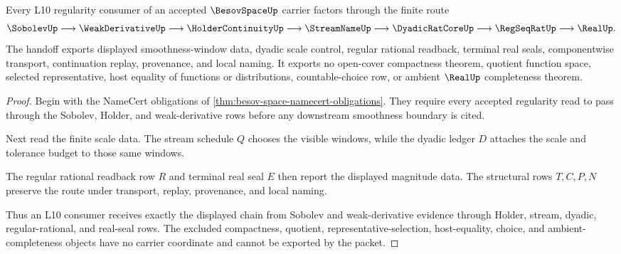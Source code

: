 \begin{theorem}
\label{thm:besov-space-l10-handoff}
Every L10 regularity consumer of an accepted $\BesovSpaceUp$ carrier factors through the finite route
$$
\SobolevUp \longrightarrow \WeakDerivativeUp \longrightarrow \HolderContinuityUp \longrightarrow \StreamNameUp \longrightarrow \DyadicRatCoreUp \longrightarrow \RegSeqRatUp \longrightarrow \RealUp .
$$
The handoff exports displayed smoothness-window data, dyadic scale control, regular rational readback, terminal real seals, componentwise transport, continuation replay, provenance, and local naming. It exports no open-cover compactness theorem, quotient function space, selected representative, host equality of functions or distributions, countable-choice row, or ambient $\RealUp$ completeness theorem.
\end{theorem}
\begin{proof}
Begin with the NameCert obligations of \autoref{thm:besov-space-namecert-obligations}. They require every accepted regularity read to pass through the Sobolev, Holder, and weak-derivative rows before any downstream smoothness boundary is cited.

Next read the finite scale data. The stream schedule $Q$ chooses the visible windows, while the dyadic ledger $D$ attaches the scale and tolerance budget to those same windows.

The regular rational readback row $R$ and terminal real seal $E$ then report the displayed magnitude data. The structural rows $T,C,P,N$ preserve the route under transport, replay, provenance, and local naming.

Thus an L10 consumer receives exactly the displayed chain from Sobolev and weak-derivative evidence through Holder, stream, dyadic, regular-rational, and real-seal rows. The excluded compactness, quotient, representative-selection, host-equality, choice, and ambient-completeness objects have no carrier coordinate and cannot be exported by the packet.
\end{proof}



